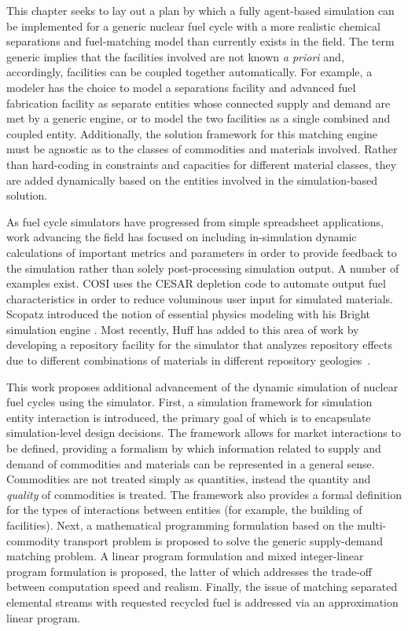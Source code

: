 This chapter seeks to lay out a plan by which a fully agent-based simulation can
be implemented for a generic nuclear fuel cycle with a more realistic chemical
separations and fuel-matching model than currently exists in the field. The term
generic implies that the facilities involved are not known \textit{a priori}
and, accordingly, facilities can be coupled together automatically. For example,
a modeler has the choice to model a separations facility and advanced fuel
fabrication facility as separate entities whose connected supply and demand are
met by a generic engine, or to model the two facilities as a single combined and
coupled entity. Additionally, the solution framework for this matching engine
must be agnostic as to the classes of commodities and materials involved. Rather
than hard-coding in constraints and capacities for different material classes,
they are added dynamically based on the entities involved in the
simulation-based solution.

As fuel cycle simulators have progressed from simple spreadsheet applications,
work advancing the field has focused on including in-simulation dynamic
calculations of important metrics and parameters in order to provide feedback to
the simulation rather than solely post-processing simulation output. A number of
examples exist. COSI uses the CESAR depletion code \cite{vidal_cesar:_2006} to
automate output fuel characteristics in order to reduce voluminous user input
for simulated materials. Scopatz introduced the notion of essential physics
modeling with his Bright simulation engine \cite{scopatz_essential_2011}. Most
recently, Huff has added to this area of work by developing a repository
facility for the \Cyclus simulator that analyzes repository effects due to
different combinations of materials in different repository
geologies~\cite{huff_integrated_2013}.

This work proposes additional advancement of the dynamic simulation of nuclear
fuel cycles using the \Cyclus simulator. First, a simulation framework for
simulation entity interaction is introduced, the primary goal of which is to
encapsulate simulation-level design decisions. The framework allows for market
interactions to be defined, providing a formalism by which information related
to supply and demand of commodities and materials can be represented in a
general sense. Commodities are not treated simply as quantities, instead the
quantity and \textit{quality} of commodities is treated. The framework also
provides a formal definition for the types of interactions between entities (for
example, the building of facilities). Next, a mathematical programming
formulation based on the multi-commodity transport problem is proposed to solve
the generic supply-demand matching problem. A linear program formulation and
mixed integer-linear program formulation is proposed, the latter of which
addresses the trade-off between computation speed and realism. Finally, the
issue of matching separated elemental streams with requested recycled fuel is
addressed via an approximation linear program.
